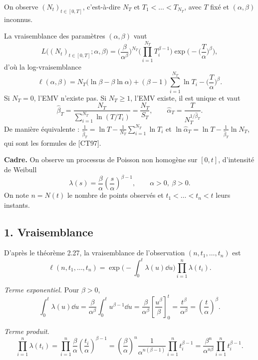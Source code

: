 On observe $(N_t)_{t\in[0,T]}$, c'est-à-dire $N_T$ et $T_1<\dots<T_{N_T}$, avec $T$ fixé et $(\alpha,\beta)$ inconnus.

\begin{proposition}\label{prop:emv}
La vraisemblance des paramètres $(\alpha,\beta)$ vaut
\[
L\big((N_t)_{t\in[0,T]};\alpha,\beta\big)=\Big(\frac{\beta}{\alpha^\beta}\Big)^{N_T}\Big(\prod_{i=1}^{N_T}T_i^{\beta-1}\Big)\exp\Big(-\Big(\frac{T}{\alpha}\Big)^\beta\Big),
\]
d'où la log-vraisemblance
\[
\ell(\alpha,\beta)=N_T\big(\ln\beta-\beta\ln\alpha\big)+(\beta-1)\sum_{i=1}^{N_T}\ln T_i-\Big(\frac{T}{\alpha}\Big)^\beta.
\]
Si $N_T=0$, l'EMV n'existe pas. Si $N_T\ge1$, l'EMV existe, il est unique et vaut
\[
\hat\beta_T=\frac{N_T}{\sum_{i=1}^{N_T}\ln(T/T_i)}=\frac{N_T}{S_T},
\qquad
\hat\alpha_T=\frac{T}{N_T^{1/\hat\beta_T}}.
\]
De manière équivalente : $\frac{1}{\hat\beta_T}=\ln T-\frac{1}{N_T}\sum_{i=1}^{N_T}\ln T_i$ et $\ln\hat\alpha_T=\ln T-\frac{1}{\hat\beta_T}\ln N_T$, qui sont les formules de [CT97].
\end{proposition}

\textbf{Cadre.} On observe un processus de Poisson non homogène sur $[0,t]$,
d'intensité de Weibull
\[
  \lambda(s)=\frac{\beta}{\alpha}\left(\frac{s}{\alpha}\right)^{\beta-1},
  \qquad \alpha>0,\ \beta>0 .
\]
On note $n=N(t)$ le nombre de points observés et $t_1<\dots<t_n<t$ leurs instants.

\subsection*{1. Vraisemblance}

D'après le théorème 2.27, la vraisemblance de l'observation $(n,t_1,\dots,t_n)$ est
\[
  \ell(n,t_1,\dots,t_n)
  = \exp\!\Big(-\int_0^t \lambda(u)\dd u\Big)\prod_{i=1}^n \lambda(t_i).
\]

\medskip
\noindent\textit{Terme exponentiel.} Pour $\beta>0$,
\[
  \int_0^t \lambda(u)\dd u
  = \frac{\beta}{\alpha^{\beta}}\int_0^t u^{\beta-1}\dd u
  = \frac{\beta}{\alpha^{\beta}}\left[\frac{u^{\beta}}{\beta}\right]_0^t
  = \frac{t^{\beta}}{\alpha^{\beta}}
  = \left(\frac{t}{\alpha}\right)^{\beta}.
\]

\medskip
\noindent\textit{Terme produit.}
\[
  \prod_{i=1}^n \lambda(t_i)
  = \prod_{i=1}^n \frac{\beta}{\alpha}\left(\frac{t_i}{\alpha}\right)^{\beta-1}
  = \left(\frac{\beta}{\alpha}\right)^{n}\frac{1}{\alpha^{n(\beta-1)}}
    \prod_{i=1}^n t_i^{\beta-1}
  = \frac{\beta^{n}}{\alpha^{n\beta}}\prod_{i=1}^n t_i^{\beta-1}.
\]

